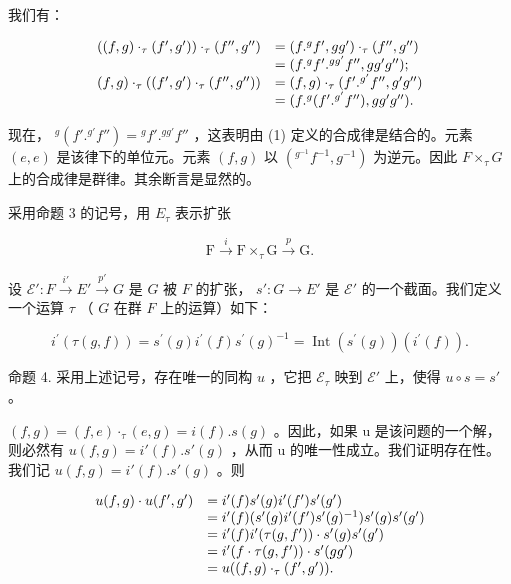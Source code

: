 我们有：

\[
\begin{array}{r l} ((f, g) \cdot_ {\tau} (f ^ {\prime}, g ^ {\prime})) \cdot_ {\tau} (f ^ {\prime \prime}, g ^ {\prime \prime}) & = (f. ^ {g} f ^ {\prime}, g g ^ {\prime}) \cdot_ {\tau} (f ^ {\prime \prime}, g ^ {\prime \prime}) \\ & = (f. ^ {g} f ^ {\prime}. ^ {g g ^ {\prime}} f ^ {\prime \prime}, g g ^ {\prime} g ^ {\prime \prime}); \\ (f, g) \cdot_ {\tau} ((f ^ {\prime}, g ^ {\prime}) \cdot_ {\tau} (f ^ {\prime \prime}, g ^ {\prime \prime})) & = (f, g) \cdot_ {\tau} (f ^ {\prime}. ^ {g ^ {\prime}} f ^ {\prime \prime}, g ^ {\prime} g ^ {\prime \prime}) \\ & = (f. ^ {g} (f ^ {\prime}. ^ {g ^ {\prime}} f ^ {\prime \prime}), g g ^ {\prime} g ^ {\prime \prime}). \end{array}
\]

现在， \({}^{g}(f'.{}^{g'}f'') = {}^{g}f'.{}^{gg'}f''\) ，这表明由 (1) 定义的合成律是结合的。元素 \((e, e)\) 是该律下的单位元。元素 \((f, g)\) 以 \((^{g^{-1}}f^{-1}, g^{-1})\) 为逆元。因此 \(F \times_{\tau} G\) 上的合成律是群律。其余断言是显然的。

采用命题 3 的记号，用 \(E_{\tau}\) 表示扩张

\[
\mathrm{F} \xrightarrow {i} \mathrm{F} \times_ {\tau} \mathrm{G} \xrightarrow {p} \mathrm{G}.
\]

设 \(\mathcal{E}'\colon F\stackrel{i'}{\to}E'\stackrel{p'}{\to}G\) 是 \(G\) 被 \(F\) 的扩张， \(s'\colon G\to E'\) 是 \(\mathcal{E}'\) 的一个截面。我们定义一个运算 \(\tau\) （ \(G\) 在群 \(F\) 上的运算）如下：

\[
i ^ {\prime} (\tau (g, f)) = s ^ {\prime} (g) i ^ {\prime} (f) s ^ {\prime} (g) ^ {- 1} = \operatorname{Int} (s ^ {\prime} (g)) (i ^ {\prime} (f)).\tag{2}
\]

命题 4. 采用上述记号，存在唯一的同构 \(u\) ，它把 \(\mathcal{E}_{\tau}\) 映到 \(\mathcal{E}'\) 上，使得 \(u \circ s = s'\) 。

\((f, g) = (f, e) \cdot_ {\tau} (e, g) = i(f).s(g)\) 。因此，如果 u 是该问题的一个解，则必然有 \(u(f,g)=i'(f).s'(g)\) ，从而 u 的唯一性成立。我们证明存在性。我们记 \(u(f,g)=i'(f).s'(g)\) 。则

\[
\begin{array}{r l} u (f, g) \cdot u (f ^ {\prime}, g ^ {\prime}) & = i ^ {\prime} (f) s ^ {\prime} (g) i ^ {\prime} (f ^ {\prime}) s ^ {\prime} (g ^ {\prime}) \\ & = i ^ {\prime} (f) (s ^ {\prime} (g) i ^ {\prime} (f ^ {\prime}) s ^ {\prime} (g) ^ {- 1}) s ^ {\prime} (g) s ^ {\prime} (g ^ {\prime}) \\ & = i ^ {\prime} (f) i ^ {\prime} (\tau (g, f ^ {\prime})) \cdot s ^ {\prime} (g) s ^ {\prime} (g ^ {\prime}) \\ & = i ^ {\prime} (f \cdot \tau (g, f ^ {\prime})) \cdot s ^ {\prime} (g g ^ {\prime}) \\ & = u ((f, g) \cdot_ {\tau} (f ^ {\prime}, g ^ {\prime})). \end{array}
\]

